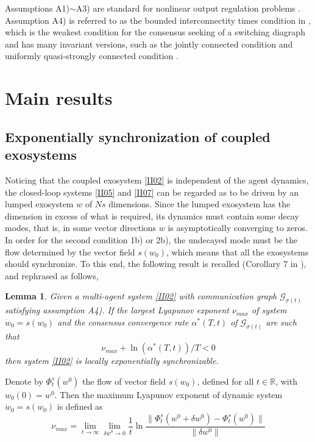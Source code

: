 \documentclass[onecolumn,a4paper,12pt]{article}
\newcommand{\real}{\mathbb{R}}
\newtheorem{lemma}{Lemma}
\numberwithin{equation}{section}
\begin{document}
Assumptions A1)$\sim$A3) are standard for nonlinear output regulation problems \cite{IsidoriTAC1990}. Assumption A4) is referred to as the bounded interconnectity times condition in \cite{XiangIJC2011}, which is the weakest condition for the consensus seeking of a switching diagraph and has many invariant versions, such as the jointly connected condition \cite{HongTAC2007} and uniformly quasi-strongly connected condition \cite{lin2006Thesis}.

\section{Main results} \label{sec03}
\subsection{Exponentially synchronization of coupled exosystems}
Noticing that the coupled exosystem \eqref{II02} is independent of the agent dynamics, the closed-loop systems \eqref{II05} and \eqref{II07} can be regarded as to be driven by an lumped exosystem $w$ of $Ns$ dimensions. Since the lumped exosystem has the dimension in excess of what is required, its dynamics must contain some decay modes, that is, in some vector directions $w$ is asymptotically converging to zeros. In order for the second condition 1b) or 2b), the undecayed mode must be the flow determined by the vector field $s(w_0)$, which means that all the exosystems should synchronize. To this end, the following result is recalled (Corollary 7 in \cite{XiangIJC2011}),
and rephrased as follows,
\begin{lemma} \label{le01}
Given a multi-agent system \eqref{II02} with communication graph $\mathcal{G}_{\sigma(t)}$satisfying assumption A4). If the largest Lyapunov exponent $\nu_{max}$ of system $\dot{w}_0=s(w_0)$ and the consensus convergence rate $\alpha^*(T,t)$ of $\mathcal{G}_{\sigma(t)}$ are such that
\begin{equation}
  \label{III01}
  \nu_{max}+\ln(\alpha^*(T,t))/T<0
\end{equation}
then system \eqref{II02} is locally exponentially synchronizable.
\end{lemma}

Denote by $\Phi_t^s(w^0)$ the flow of vector field $s(w_0)$, defined for all $t\in\real$,  with $w_0(0)=w^0$. Then the maximum Lyapunov exponent of dynamic system $\dot{w}_0=s(w_0)$ is defined as \cite{CenciniBOOK2010}
\begin{equation}
  \nu_{max} = \lim_{t\rightarrow \infty} \lim_{\delta w^0\rightarrow 0}\frac{1}{t} \ln\frac{\|\Phi_t^s(w^0+\delta w^0)-\Phi_t^s(w^0)\|}{\|\delta w^0\|}
\end{equation}
\end{document}
